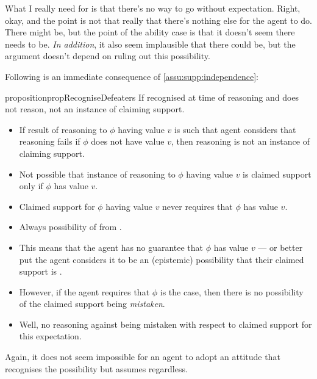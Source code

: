{
  \color{blue}
  What I really need for \nI{} is that there's no way to go without expectation.
  Right, okay, and the point is not that really that there's nothing else for the agent to do.
  There might be, but the point of the ability case is that it doesn't seem there needs to be.
  \emph{In addition}, it also seem implausible that there could be, but the argument doesn't depend on ruling out this possibility.
}

\begin{note}
  Following is an immediate consequence of \autoref{assu:supp:independence}:

  \begin{restatable}{proposition}{propRecogniseDefeaters}\label{prop:CS-only-if-reason-recognised-defeaters}
    If recognised \requ{} at time of reasoning and does not reason, not an instance of claiming support.
  \end{restatable}
\end{note}

  \begin{note}
  \begin{itemize}
  \item If result of reasoning to \(\phi\) having value \(v\) is such that agent considers that reasoning fails if \(\phi\) does not have value \(v\), then reasoning is not an instance of claiming support.
  \item Not possible that instance of reasoning to \(\phi\) having value \(v\) is claimed support only if \(\phi\) has value \(v\).
  \item Claimed support for \(\phi\) having value \(v\) never requires that \(\phi\) has value \(v\).
  \end{itemize}
\end{note}

\begin{note}
  \color{red}
    \begin{itemize}
    \item Always possibility of \mom{} from \nfcs{}.
    \item This means that the agent has no guarantee that \(\phi\) has value \(v\) --- or better put the agent considers it to be an (epistemic) possibility that their claimed support is \mom{}.
    \item However, if the agent requires that \(\phi\) is the case, then there is no possibility of the claimed support being \emph{mistaken}.
    \item Well, no reasoning against being mistaken with respect to claimed support for this expectation.
  \end{itemize}

  Again, it does not seem impossible for an agent to adopt an attitude that recognises the possibility but assumes regardless.
\end{note}

